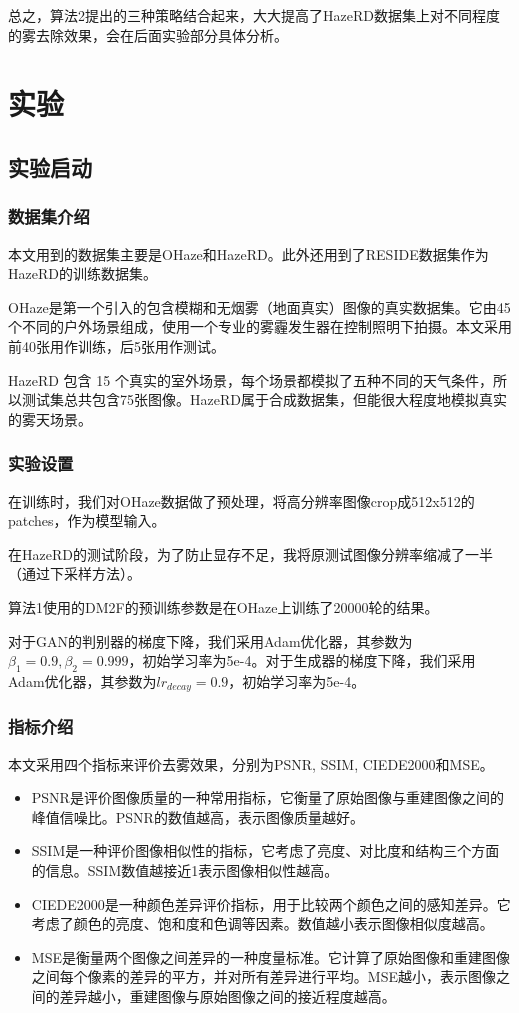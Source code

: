 \documentclass{article}
\begin{document}
总之，算法2提出的三种策略结合起来，大大提高了HazeRD数据集上对不同程度的雾去除效果，会在后面实验部分具体分析。

\section{实验}

\subsection{实验启动}
\subsubsection{数据集介绍}
本文用到的数据集主要是OHaze\cite{ancuti2018haze}和HazeRD\cite{zhang2017hazerd}。此外还用到了RESIDE\cite{li2018benchmarking}数据集作为HazeRD的训练数据集。

OHaze是第一个引入的包含模糊和无烟雾（地面真实）图像的真实数据集。它由45个不同的户外场景组成，使用一个专业的雾霾发生器在控制照明下拍摄。本文采用前40张用作训练，后5张用作测试。

HazeRD 包含 15 个真实的室外场景，每个场景都模拟了五种不同的天气条件，所以测试集总共包含75张图像。HazeRD属于合成数据集，但能很大程度地模拟真实的雾天场景。

\subsubsection{实验设置}
在训练时，我们对OHaze数据做了预处理，将高分辨率图像crop成512x512的patches，作为模型输入。

在HazeRD的测试阶段，为了防止显存不足，我将原测试图像分辨率缩减了一半（通过下采样方法）。

算法1使用的DM2F的预训练参数是在OHaze上训练了20000轮的结果。

对于GAN的判别器的梯度下降，我们采用Adam优化器，其参数为$\beta_1 = 0.9, \beta_2 = 0.999$，初始学习率为5e-4。对于生成器的梯度下降，我们采用Adam优化器，其参数为$lr_{decay}=0.9$，初始学习率为5e-4。
\subsubsection{指标介绍}

本文采用四个指标来评价去雾效果，分别为PSNR, SSIM, CIEDE2000和MSE。
\begin{itemize}
    \item PSNR是评价图像质量的一种常用指标，它衡量了原始图像与重建图像之间的峰值信噪比。PSNR的数值越高，表示图像质量越好。
    \item SSIM是一种评价图像相似性的指标，它考虑了亮度、对比度和结构三个方面的信息。SSIM数值越接近1表示图像相似性越高。
    \item CIEDE2000是一种颜色差异评价指标，用于比较两个颜色之间的感知差异。它考虑了颜色的亮度、饱和度和色调等因素。数值越小表示图像相似度越高。
    \item MSE是衡量两个图像之间差异的一种度量标准。它计算了原始图像和重建图像之间每个像素的差异的平方，并对所有差异进行平均。MSE越小，表示图像之间的差异越小，重建图像与原始图像之间的接近程度越高。
\end{itemize}
\end{document}
